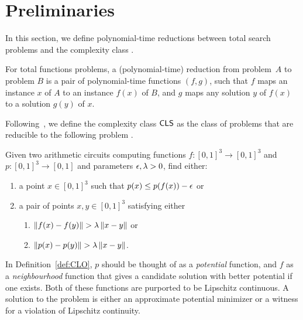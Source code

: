 


\section{Preliminaries}


In this section, we define polynomial-time reductions between total search problems
and the complexity class \CLS.
%
\begin{definition}
For total functions problems, a (polynomial-time) reduction from problem~$A$ to
problem $B$ is a pair of polynomial-time functions $(f,g)$, such that $f$ 
maps an instance $x$ of $A$ to an instance $f(x)$ of $B$, and $g$ maps
any solution $y$ of $f(x)$ to a solution $g(y)$ of $x$.
\end{definition}
%
Following~\cite{daskalakis2011continuous}, we define the complexity class $\mathsf{CLS}$
as the class of problems that are reducible to the following problem \CLO.

\begin{definition}
\label{def:CLO}
Given two arithmetic circuits computing functions $f : [0,1]^3\to [0,1]^3$ and $p :
[0,1]^3 \to [0,1]$ and parameters $\epsilon, \lambda > 0$, find either:
\begin{enumerate}[leftmargin=*,label=(C\arabic*)]
\item a point $x\in [0,1]^3$ such that $p(x) \leq p(f(x)) - \epsilon$ or \label{c_fixpoint}
\item a pair of points $x,y\in [0,1]^3$ satisfying either \label{c_violation}
  \begin{enumerate}[label=(C\arabic{enumi}\alph*)] 
  \item $\left\| f(x) - f(y) \right\| > \lambda \left\| x-y \right\|$ or \label{c_bad_f}
  \item $\left\| p(x) - p(y) \right\| > \lambda \left\| x-y \right\|$. \label{c_bad_p}
  \end{enumerate}
\end{enumerate}
\end{definition}

In Definition~\ref{def:CLO}, $p$ should be thought of as a \emph{potential}
function, and $f$ as a \emph{neighbourhood} function that gives a candidate
solution with better potential if one exists. Both of these functions are 
purported to be Lipschitz continuous. A solution to the problem is either an approximate
potential minimizer or a witness for a violation of Lipschitz continuity.

